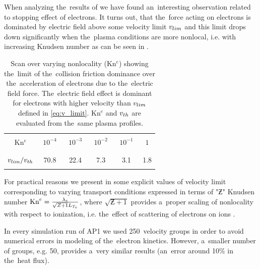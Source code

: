 When analyzing the~results of  we have found 
an~interesting observation related to stopping effect of electrons.
It turns out, that the~force acting on electrons is dominated by electric field
above some velocity limit $v_{lim}$ and this limit drops down significantly
when the~plasma conditions are more nonlocal, i.e. with increasing Knudsen 
number as can be seen in .

\begin{table}
\begin{center}
  \begin{tabular}{c|ccccc}
    \hline\hline\\
    Kn$^e$ & $\,\,10^{-4}\,\,$ & $\,\,10^{-3}\,\,$ & $\,\,10^{-2}\,\,$ & $\,\,10^{-1}\,\,$ & $\,\,1\,\,$ \\\\
    \hline\\
    $v_{lim} / v_{th}$ & 70.8 & 22.4 & 7.3 & 3.1 & 1.8\\\\
    \hline\hline
  \end{tabular}
  \caption{
  Scan over varying nonlocality (Kn$^e$) showing the~limit of 
  the~collision friction dominance over the~acceleration of electrons 
  due to the~electric field force. The~electric field effect is dominant
  for electrons with higher velocity than $v_{lim}$ defined in 
  \eqref{eq:v_limit}. Kn$^e$ and $v_{th}$ are evaluated from the~same 
  plasma profiles.
  }
\label{tab:vlim}
\end{center}
\end{table}

For practical reasons we present in  
some explicit values of velocity limit corresponding to varying transport 
conditions expressed in terms of "$\Zbar$" Knudsen number 
$\text{Kn}^e = \frac{\lambda_e}{\sqrt{Z + 1}L_{T_e}}$, 
where $\sqrt{\Zbar + 1}$ provides a~proper scaling of nonlocality with respect
to ionization, i.e. the~effect of scattering of electrons on ions 
\cite{LMV_1983_7}.

In every simulation run of AP1 we used 250~velocity groups in order to avoid
numerical errors in modeling of the~electron kinetics. However, a~smaller 
number of groups, e.g. 50, provides a~very similar results 
(an~error around 10$\%$ in the~heat flux).

